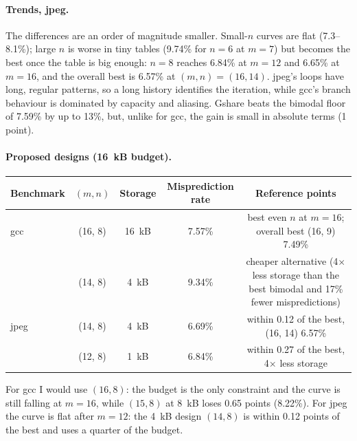 \documentclass[11pt]{article}
\begin{document}
\paragraph{Trends, jpeg.} The differences are an order of magnitude smaller. Small-$n$ curves are flat (7.3--8.1\%); large $n$ is worse in tiny tables (9.74\% for $n=6$ at $m=7$) but becomes the best once the table is big enough: $n=8$ reaches 6.84\% at $m=12$ and 6.65\% at $m=16$, and the overall best is 6.57\% at $(m,n)=(16,14)$. jpeg's loops have long, regular patterns, so a long history identifies the iteration, while gcc's branch behaviour is dominated by capacity and aliasing. Gshare beats the bimodal floor of 7.59\% by up to 13\%, but, unlike for gcc, the gain is small in absolute terms (1 point).

\paragraph{Proposed designs (16~kB budget).}
\begin{center}\small\begin{tabular}{lcccc}\toprule
Benchmark & $(m,n)$ & Storage & Misprediction rate & Reference points\\\midrule
gcc & (16, 8) & 16~kB & 7.57\% & best even $n$ at $m=16$; overall best (16, 9) 7.49\%\\
 & (14, 8) & 4~kB & 9.34\% & cheaper alternative (4$\times$ less storage than the best bimodal and 17\% fewer mispredictions)\\
jpeg & (14, 8) & 4~kB & 6.69\% & within 0.12 of the best, (16, 14) 6.57\%\\
 & (12, 8) & 1~kB & 6.84\% & within 0.27 of the best, 4$\times$ less storage\\\bottomrule
\end{tabular}\end{center}
For gcc I would use $(16,8)$: the budget is the only constraint and the curve is still falling at $m=16$, while $(15,8)$ at 8~kB loses 0.65 points (8.22\%). For jpeg the curve is flat after $m=12$: the 4~kB design $(14,8)$ is within 0.12 points of the best and uses a quarter of the budget.
\end{document}
